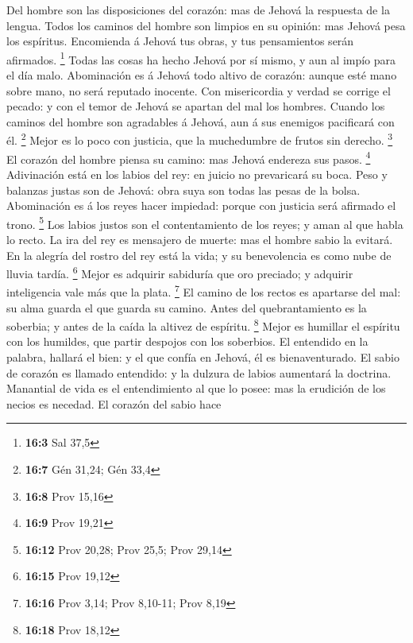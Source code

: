  Del hombre son las disposiciones del corazón: mas de
Jehová la respuesta de la lengua.  Todos los caminos del
hombre son limpios en su opinión: mas Jehová pesa los espíritus.
 Encomienda á Jehová tus obras, y tus pensamientos serán
afirmados. \footnote{\textbf{16:3} Sal 37,5}  Todas las
cosas ha hecho Jehová por sí mismo, y aun al impío para el día malo.
 Abominación es á Jehová todo altivo de corazón: aunque
esté mano sobre mano, no será reputado inocente.  Con
misericordia y verdad se corrige el pecado: y con el temor de Jehová se
apartan del mal los hombres.  Cuando los caminos del
hombre son agradables á Jehová, aun á sus enemigos pacificará con él.
\footnote{\textbf{16:7} Gén 31,24; Gén 33,4}  Mejor es lo
poco con justicia, que la muchedumbre de frutos sin derecho. \footnote{\textbf{16:8}
  Prov 15,16}  El corazón del hombre piensa su camino: mas
Jehová endereza sus pasos. \footnote{\textbf{16:9} Prov 19,21}
 Adivinación está en los labios del rey: en juicio no
prevaricará su boca.  Peso y balanzas justas son de
Jehová: obra suya son todas las pesas de la bolsa. 
Abominación es á los reyes hacer impiedad: porque con justicia será
afirmado el trono. \footnote{\textbf{16:12} Prov 20,28; Prov 25,5; Prov
  29,14}  Los labios justos son el contentamiento de los
reyes; y aman al que habla lo recto.  La ira del rey es
mensajero de muerte: mas el hombre sabio la evitará.  En
la alegría del rostro del rey está la vida; y su benevolencia es como
nube de lluvia tardía. \footnote{\textbf{16:15} Prov 19,12}
 Mejor es adquirir sabiduría que oro preciado; y adquirir
inteligencia vale más que la plata. \footnote{\textbf{16:16} Prov 3,14;
  Prov 8,10-11; Prov 8,19}  El camino de los rectos es
apartarse del mal: su alma guarda el que guarda su camino.
 Antes del quebrantamiento es la soberbia; y antes de la
caída la altivez de espíritu. \footnote{\textbf{16:18} Prov 18,12}
 Mejor es humillar el espíritu con los humildes, que
partir despojos con los soberbios.  El entendido en la
palabra, hallará el bien: y el que confía en Jehová, él es
bienaventurado.  El sabio de corazón es llamado
entendido: y la dulzura de labios aumentará la doctrina. 
Manantial de vida es el entendimiento al que lo posee: mas la erudición
de los necios es necedad.  El corazón del sabio hace
